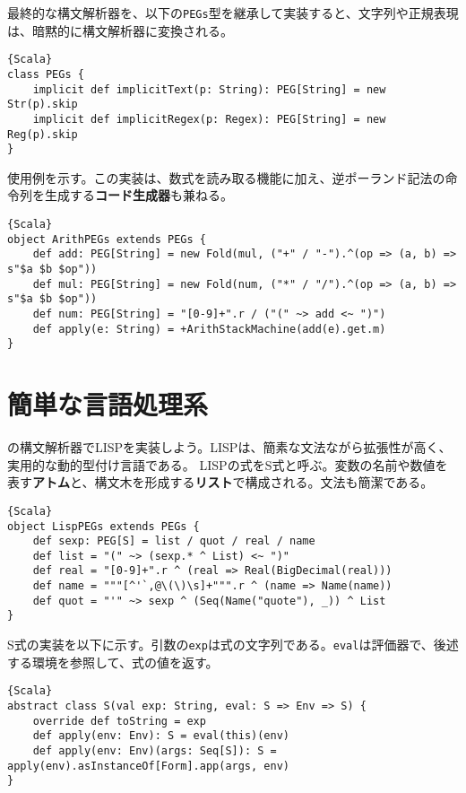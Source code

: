 \documentclass[10pt,a4paper]{book}
\begin{document}
最終的な構文解析器を、以下の\texttt{PEGs}型を継承して実装すると、文字列や正規表現は、暗黙的に構文解析器に変換される。

\begin{Verbatim}{Scala}
class PEGs {
	implicit def implicitText(p: String): PEG[String] = new Str(p).skip
	implicit def implicitRegex(p: Regex): PEG[String] = new Reg(p).skip
}
\end{Verbatim}

使用例を示す。この実装は、数式を読み取る機能に加え、逆ポーランド記法の命令列を生成する\textbf{コード生成器}も兼ねる。

\begin{Verbatim}{Scala}
object ArithPEGs extends PEGs {
	def add: PEG[String] = new Fold(mul, ("+" / "-").^(op => (a, b) => s"$a $b $op"))
	def mul: PEG[String] = new Fold(num, ("*" / "/").^(op => (a, b) => s"$a $b $op"))
	def num: PEG[String] = "[0-9]+".r / ("(" ~> add <~ ")")
	def apply(e: String) = +ArithStackMachine(add(e).get.m)
}
\end{Verbatim}

\section{簡単な言語処理系}

の構文解析器でLISPを実装しよう。LISPは、簡素な文法ながら拡張性が高く、実用的な動的型付け言語である。
LISPの式をS式と呼ぶ。変数の名前や数値を表す\textbf{アトム}と、構文木を形成する\textbf{リスト}で構成される。文法も簡潔である。

\begin{Verbatim}{Scala}
object LispPEGs extends PEGs {
	def sexp: PEG[S] = list / quot / real / name
	def list = "(" ~> (sexp.* ^ List) <~ ")"
	def real = "[0-9]+".r ^ (real => Real(BigDecimal(real)))
	def name = """[^'`,@\(\)\s]+""".r ^ (name => Name(name))
	def quot = "'" ~> sexp ^ (Seq(Name("quote"), _)) ^ List
}
\end{Verbatim}

S式の実装を以下に示す。引数の\texttt{exp}は式の文字列である。\texttt{eval}は評価器で、後述する環境を参照して、式の値を返す。

\begin{Verbatim}{Scala}
abstract class S(val exp: String, eval: S => Env => S) {
	override def toString = exp
	def apply(env: Env): S = eval(this)(env)
	def apply(env: Env)(args: Seq[S]): S = apply(env).asInstanceOf[Form].app(args, env)
}
\end{Verbatim}
\end{document}
